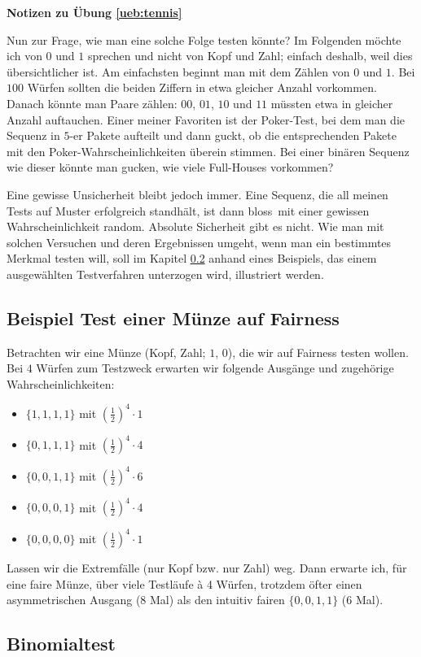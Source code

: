\documentclass[%
<<<<<<< Updated upstream
11pt,%
twoside,%
titlepage,%
german,%
=======
11pt,%
twoside,%
titlepage,%
swissgerman,%
>>>>>>> Stashed changes
headsepline%
]{scrartcl}
\newcommand{\faReturnGray}{\textcolor{gray}{\faMailReply}} %
\theoremstyle{definition}
\theoremstyle{plain}
\newcommand{\concatueb}[1]{ueb:#1}%
\newcommand{\concatlsg}[1]{lsg:#1}%
\newenvironment{lsg}[1]{%
    \par\noindent\textbf{Notizen zu Übung \ref{\concatueb{#1}}}\label{\concatlsg{#1}}
    \hfill\hyperref[\concatueb{#1}]{\faReturnGray}\par %
}{%
    \par%
}
\newcommand{\concatueb}[1]{ueb:#1}%
\newcommand{\concatlsg}[1]{lsg:#1}%
\newenvironment{lsg}[1]{%
    \par\noindent\textbf{Notizen zu Übung \ref{\concatueb{#1}}.}%
    \label{\concatlsg{#1}}
}{%
    \par%
}
\begin{document}
\begin{lsg}{tennis}
Nun zur Frage, wie man eine solche Folge testen könnte?
Im Folgenden möchte ich von $0$ und $1$ sprechen und nicht von Kopf und Zahl; einfach deshalb, weil dies übersichtlicher ist.
Am einfachsten beginnt man mit dem Zählen von $0$ und $1$. Bei $100$ Würfen sollten die beiden Ziffern in etwa gleicher Anzahl vorkommen. Danach könnte man Paare zählen: $00$, $01$, $10$ und $11$ müssten etwa in gleicher Anzahl auftauchen. Einer meiner Favoriten ist der Poker-Test, bei dem man die Sequenz in $5$-er Pakete aufteilt und dann guckt, ob die entsprechenden Pakete mit den Poker-Wahrscheinlichkeiten überein stimmen. Bei einer binären Sequenz wie dieser könnte man gucken, wie viele Full-Houses vorkommen?\par
Eine gewisse Unsicherheit bleibt jedoch immer. Eine Sequenz, die all meinen Tests auf Muster erfolgreich standhält, ist dann \glqq bloss\grqq\ mit einer gewissen Wahrscheinlichkeit random. Absolute Sicherheit gibt es nicht. Wie man mit solchen Versuchen und deren Ergebnissen umgeht, wenn man ein bestimmtes Merkmal testen will, soll im Kapitel \ref{subsec:bspfreiw} anhand eines Beispiels, das einem ausgewählten Testverfahren unterzogen wird, illustriert werden.

\subsection{Beispiel Test einer Münze auf Fairness}

Betrachten wir eine Münze (Kopf, Zahl; $1$, $0$), die wir auf Fairness testen wollen. Bei $4$ Würfen zum Testzweck erwarten wir folgende Ausgänge und zugehörige Wahrscheinlichkeiten:
\begin{itemize}
    \item $\{1,1,1,1\}$ mit $(\tfrac{1}{2})^4\cdot1$
    \item $\{0,1,1,1\}$ mit $(\tfrac{1}{2})^4\cdot4$
    \item $\{0,0,1,1\}$ mit $(\tfrac{1}{2})^4\cdot6$
    \item $\{0,0,0,1\}$ mit $(\tfrac{1}{2})^4\cdot4$
    \item $\{0,0,0,0\}$ mit $(\tfrac{1}{2})^4\cdot1$
\end{itemize}

Lassen wir die Extremfälle (nur Kopf bzw. nur Zahl) weg. Dann erwarte ich, für eine faire Münze, über viele Testläufe à 4 Würfen, trotzdem öfter einen asymmetrischen Ausgang (8 Mal) als den intuitiv fairen $\{0,0,1,1\}$ (6 Mal).

\subsection{Binomialtest}\label{subsec:bspfreiw}


\end{lsg}
\end{document}
